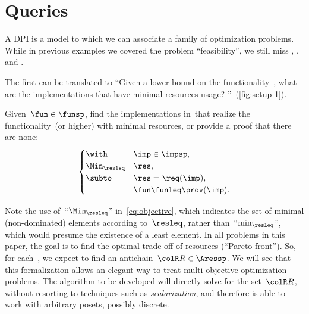 
\clearpage

\section{Queries}
\label{sec:design-problems-querying}

A DPI is a model to which we can associate a family of optimization problems.
While in previous examples we covered the problem ``feasibility'', we still miss \FixFunMinRes, \FixResMaxFun, and \FeasibleImp.

The first can be translated to ``Given a lower bound on the functionality~\fun, what are the implementations that have minimal resources usage?
''~(\cref{fig:setup-1}).

\begin{problem}[\FixFunMinRes]
\label{prob:FixFunMinRes}
Given~$\fun\in\funsp$, find the implementations in~\impsp that realize the functionality~\fun (or higher) with minimal resources, or provide a proof that there are none:
\begin{equation}
	\label{eq:objective}
	\begin{cases}
		\with          & \imp\in\impsp,          \\
		\Min_{\resleq} & \res,                   \\
		\subto         & \res=\req(\imp),        \\
		               & \fun\funleq\prov(\imp).
	\end{cases}
\end{equation}
\end{problem}

\begin{figure*}
	\centering
	\caption{}
	\label{fig:setup-1}
\end{figure*}

\begin{remark}
	Note the use of~``$\Min_{\resleq}$'' in~\cref{eq:objective},
	which indicates the set of minimal (non-dominated) elements according to~$\resleq$, rather than~``$\min_{\resleq}$'', which would presume the existence of a least element.
	In all problems in this paper, the goal is to find the optimal trade-off of resources (``Pareto front'').
	So, for each~\fun, we expect to find an antichain~${\colR R}\in\Aressp$.
	We will see that this formalization allows an elegant way to treat multi-objective optimization problems.
	The algorithm to be developed will directly solve for the set~${\colR R}$, without resorting to techniques such as \emph{scalarization}, and therefore is able to work with arbitrary posets, possibly discrete.
\end{remark}

